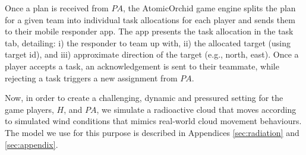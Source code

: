 Once a plan is received from $PA$, the AtomicOrchid game engine splits the plan for a given team into individual task allocations for each player and sends them to their mobile responder app. The app presents the task allocation in the task tab, detailing: i) the responder to team up with, ii) the allocated target (using target id), and iii) approximate direction of the target (e.g., north, east).  Once a player accepts a task, an acknowledgement is sent to their teammate, while rejecting a task triggers a new assignment from $PA$. 

Now, in order to create a challenging, dynamic and pressured setting for the game players, $H$, and $PA$, we simulate a radioactive cloud that moves according to simulated wind conditions that mimics real-world cloud movement behaviours. The model we use for this purpose is described in Appendices \ref{sec:radiation} and \ref{sec:appendix}.


